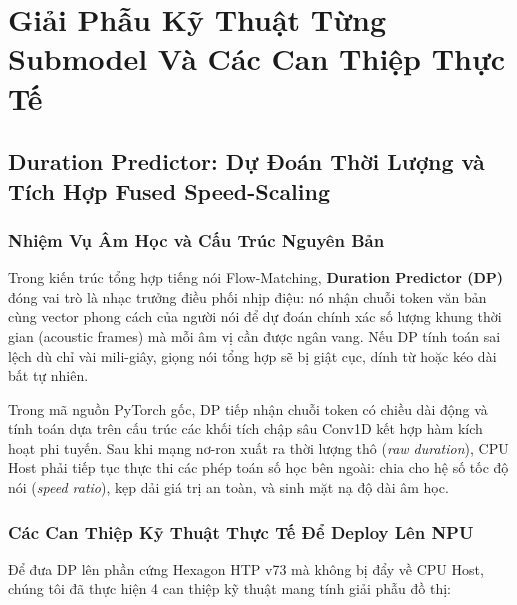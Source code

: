 \documentclass[11pt,a4paper,oneside,table]{report}
\begin{document}
\part{Giải Phẫu Kỹ Thuật Từng Submodel Và Các Can Thiệp Thực Tế}

\chapter{Duration Predictor: Dự Đoán Thời Lượng và Tích Hợp Fused Speed-Scaling}
\label{chap:dp}

\section{Nhiệm Vụ Âm Học và Cấu Trúc Nguyên Bản}
Trong kiến trúc tổng hợp tiếng nói Flow-Matching, \textbf{Duration Predictor (DP)} đóng vai trò là nhạc trưởng điều phối nhịp điệu: nó nhận chuỗi token văn bản cùng vector phong cách của người nói để dự đoán chính xác số lượng khung thời gian (acoustic frames) mà mỗi âm vị cần được ngân vang. Nếu DP tính toán sai lệch dù chỉ vài mili-giây, giọng nói tổng hợp sẽ bị giật cục, dính từ hoặc kéo dài bất tự nhiên.

Trong mã nguồn PyTorch gốc, DP tiếp nhận chuỗi token có chiều dài động và tính toán dựa trên cấu trúc các khối tích chập sâu Conv1D kết hợp hàm kích hoạt phi tuyến. Sau khi mạng nơ-ron xuất ra thời lượng thô (\textit{raw duration}), CPU Host phải tiếp tục thực thi các phép toán số học bên ngoài: chia cho hệ số tốc độ nói (\textit{speed ratio}), kẹp dải giá trị an toàn, và sinh mặt nạ độ dài âm học.

\section{Các Can Thiệp Kỹ Thuật Thực Tế Để Deploy Lên NPU}
Để đưa DP lên phần cứng Hexagon HTP v73 mà không bị đẩy về CPU Host, chúng tôi đã thực hiện 4 can thiệp kỹ thuật mang tính giải phẫu đồ thị:
\end{document}

